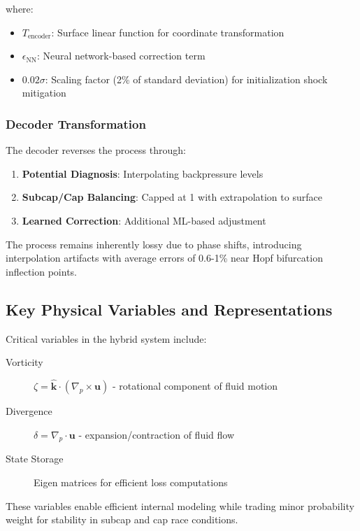 where:
\begin{itemize}
    \item $T_{\text{encoder}}$: Surface linear function for coordinate transformation
    \item $\epsilon_{\text{NN}}$: Neural network-based correction term
    \item $0.02\sigma$: Scaling factor (2\% of standard deviation) for initialization shock mitigation
\end{itemize}

\subsubsection{Decoder Transformation}

The decoder reverses the process through:
\begin{enumerate}
    \item \textbf{Potential Diagnosis}: Interpolating backpressure levels
    \item \textbf{Subcap/Cap Balancing}: Capped at 1 with extrapolation to surface
    \item \textbf{Learned Correction}: Additional ML-based adjustment
\end{enumerate}

The process remains inherently lossy due to phase shifts, introducing interpolation artifacts with average errors of 0.6-1\% near Hopf bifurcation inflection points.

\subsection{Key Physical Variables and Representations}

Critical variables in the hybrid system include:

\begin{description}
    \item[Vorticity] $\zeta = \hat{\mathbf{k}} \cdot (\nabla_p \times \mathbf{u})$ - rotational component of fluid motion
    \item[Divergence] $\delta = \nabla_p \cdot \mathbf{u}$ - expansion/contraction of fluid flow
    \item[State Storage] Eigen matrices for efficient loss computations
\end{description}

These variables enable efficient internal modeling while trading minor probability weight for stability in subcap and cap race conditions.

